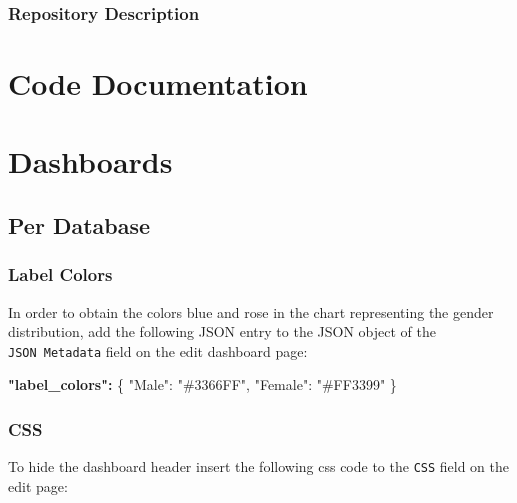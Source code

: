 \documentclass[
]{book}
\newenvironment{Shaded}{\begin{snugshade}}{\end{snugshade}}
\newcommand{\DataTypeTok}[1]{\textcolor[rgb]{0.13,0.29,0.53}{#1}}
\newcommand{\ErrorTok}[1]{\textcolor[rgb]{0.64,0.00,0.00}{\textbf{#1}}}
\newcommand{\FunctionTok}[1]{\textcolor[rgb]{0.00,0.00,0.00}{#1}}
\newcommand{\StringTok}[1]{\textcolor[rgb]{0.31,0.60,0.02}{#1}}
\begin{document}
\hypertarget{repository-description}{%
\subsection*{Repository Description}\label{repository-description}}

\hypertarget{code-documentation}{%
\chapter{Code Documentation}\label{code-documentation}}

\hypertarget{dashboards}{%
\chapter{Dashboards}\label{dashboards}}

\hypertarget{PerDatabaseDashboard}{%
\section{Per Database}\label{PerDatabaseDashboard}}

\hypertarget{label-colors}{%
\subsection*{Label Colors}\label{label-colors}}

In order to obtain the colors blue and rose in the chart representing the gender distribution,
add the following JSON entry to the JSON object of the \texttt{JSON\ Metadata} field on the edit dashboard page:

\begin{Shaded}
\begin{Highlighting}[]
\ErrorTok{"label\_colors":} \FunctionTok{\{}
    \DataTypeTok{"Male"}\FunctionTok{:} \StringTok{"\#3366FF"}\FunctionTok{,} 
    \DataTypeTok{"Female"}\FunctionTok{:} \StringTok{"\#FF3399"}
\FunctionTok{\}}
\end{Highlighting}
\end{Shaded}

\hypertarget{css}{%
\subsection*{CSS}\label{css}}

To hide the dashboard header insert the following css code to the \texttt{CSS} field on the edit page:
\end{document}
